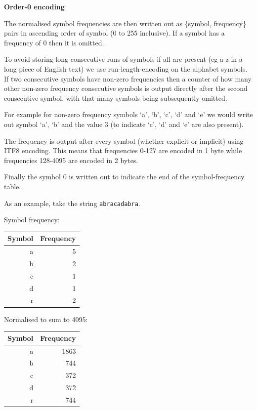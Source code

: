 \documentclass[a4paper]{article}
\begin{document}
\textbf{Order-0 encoding}

The normalised symbol frequencies are then written out as \{symbol,
frequency\} pairs in ascending order of symbol (0 to 255 inclusive).
If a symbol has a frequency of 0 then it is omitted.

To avoid storing long consecutive runs of symbols if all are present
(eg a-z in a long piece of English text) we use run-length-encoding on
the alphabet symbols.  If two consecutive symbols have non-zero
frequencies then a counter of how many other non-zero frequency
consecutive symbols is output directly after the second consecutive
symbol, with that many symbols being subsequently omitted. 

For example for non-zero frequency symbols `a', `b', `c', `d' and `e'
we would write out symbol `a', `b' and the value 3 (to indicate `c',
`d' and `e' are also present).

The frequency is output after every symbol (whether explicit or
implicit) using ITF8 encoding. This means that frequencies 0-127 are
encoded in 1 byte while frequencies 128-4095 are encoded in 2 bytes.

Finally the symbol 0 is written out to indicate the end of the
symbol-frequency table.

As an example, take the string \texttt{abracadabra}.

\begin{minipage}[t]{0.5\textwidth}
Symbol frequency:
\\[8pt]
\begin{tabular}{ |r|r| }
\hline
Symbol & Frequency\\
\hline
a & 5 \\
b & 2 \\
c & 1 \\
d & 1 \\
r & 2 \\
\hline
\end{tabular}
\end{minipage}
\begin{minipage}[t]{0.5\textwidth}
Normalised to sum to 4095:
\\[8pt]
\begin{tabular}{ |r|r|}
\hline
Symbol & Frequency\\
\hline
a & 1863 \\
b &  744 \\
c &  372 \\
d &  372 \\
r &  744 \\
\hline
\end{tabular}
\end{minipage}
\end{document}

